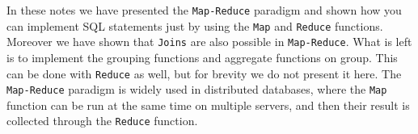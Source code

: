 In these notes we have presented the \texttt{Map-Reduce} paradigm and shown how you can implement SQL statements just by using the \texttt{Map} and \texttt{Reduce} functions. Moreover we have shown that \texttt{Joins} are also possible in \texttt{Map-Reduce}. What is left is to implement the grouping functions and aggregate functions on group. This can be done with \texttt{Reduce} as well, but for brevity we do not present it here. The \texttt{Map-Reduce} paradigm is widely used in distributed databases, where the \texttt{Map} function can be run at the same time on multiple servers, and then their result is collected through the \texttt{Reduce} function.